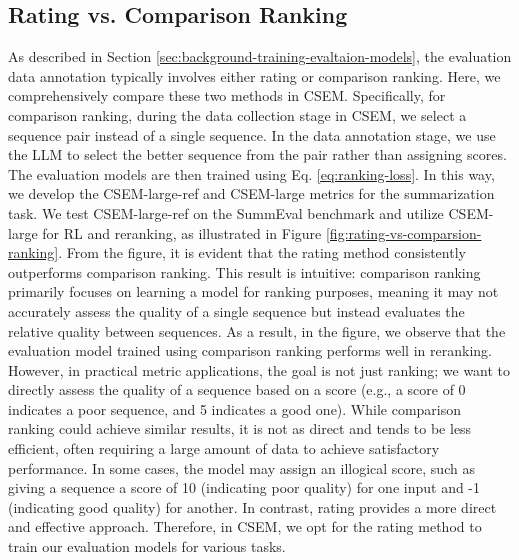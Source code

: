 \documentclass[lettersize,journal]{IEEEtran}
\begin{document}
\subsection{Rating vs. Comparison Ranking}
\label{sec:comparison-rating-ranking}
As described in Section \ref{sec:background-training-evaltaion-models}, the evaluation data annotation typically involves either rating or comparison ranking. Here, we comprehensively compare these two methods in CSEM. Specifically, for comparison ranking, during the data collection stage in CSEM, we select a sequence pair instead of a single sequence. In the data annotation stage, we use the LLM to select the better sequence from the pair rather than assigning scores. The evaluation models are then trained using Eq. \ref{eq:ranking-loss}. In this way, we develop the CSEM-large-ref and CSEM-large metrics for the summarization task. We test CSEM-large-ref on the SummEval benchmark and utilize CSEM-large for RL and reranking, as illustrated in Figure \ref{fig:rating-vs-comparsion-ranking}. From the figure, it is evident that the rating method consistently outperforms comparison ranking. This result is intuitive: comparison ranking primarily focuses on learning a model for ranking purposes, meaning it may not accurately assess the quality of a single sequence but instead evaluates the relative quality between sequences. As a result, in the figure, we observe that the evaluation model trained using comparison ranking performs well in reranking. However, in practical metric applications, the goal is not just ranking; we want to directly assess the quality of a sequence based on a score (e.g., a score of 0 indicates a poor sequence, and 5 indicates a good one). While comparison ranking could achieve similar results, it is not as direct and tends to be less efficient, often requiring a large amount of data to achieve satisfactory performance. In some cases, the model may assign an illogical score, such as giving a sequence a score of 10 (indicating poor quality) for one input and -1 (indicating good quality) for another. In contrast, rating provides a more direct and effective approach. Therefore, in CSEM, we opt for the rating method to train our evaluation models for various tasks.


\end{document}
